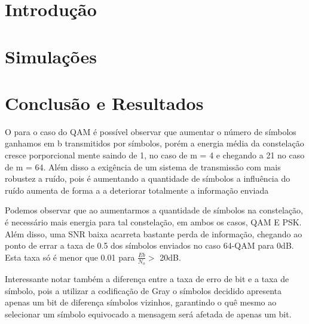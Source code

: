 \documentclass[a4paper, 12pt]{article}
\begin{document}



% 

\section{Introdução}

\section{Simulações}

\clearpage

\clearpage

\clearpage

\clearpage

\clearpage

\section{Conclusão e Resultados}

O para o caso do QAM é possível observar que aumentar o número de símbolos ganhamos em b transmitidos por símbolos, porém a energia média da constelação cresce porporcional mente saindo de 1, no caso de m = 4 e chegando a 21 no caso de m = 64. Além disso a exigência de um sistema de transmissão com mais robustez a ruído, pois é aumentando a quantidade de símbolos a influência do ruído aumenta de forma a a deteriorar totalmente a informação enviada

Podemos observar que ao aumentarmos a quantidade de símbolos na constelação, é necessário mais energia para tal constelação, em ambos os casos, QAM E PSK. Além disso, uma SNR baixa acarreta bastante perda de informação, chegando ao ponto de errar a taxa de 0.5 dos símbolos enviados no caso 64-QAM para 0dB. Esta taxa só é menor que 0.01 para $\frac{Eb}{N_o} > $ 20dB.

Interessante notar também a diferença entre a taxa de erro de bit e a taxa de símbolo, pois a utilizar a codificação de Gray o símbolos decidido apresenta apenas um bit de diferença símbolos vizinhos, garantindo o quê mesmo ao selecionar um símbolo equivocado a mensagem será afetada de apenas um bit.


\clearpage

\printbibliography[heading=bibintoc]    %
\end{document}
